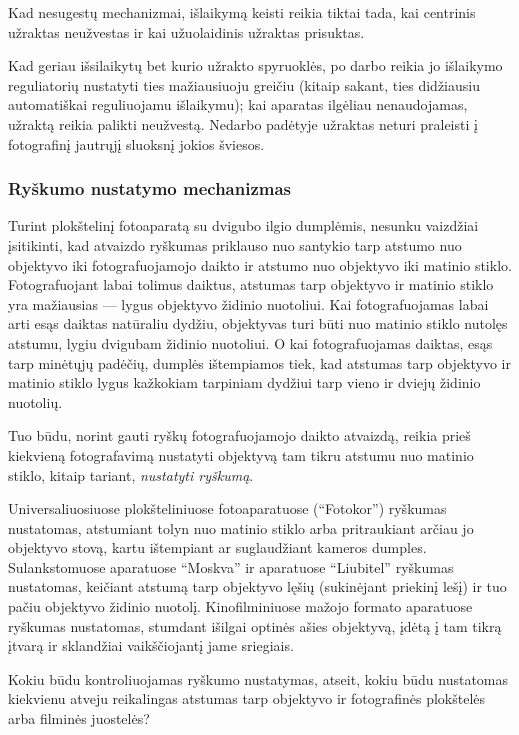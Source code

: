 \documentclass{book}
\begin{document}
					Kad nesugestų mechanizmai, išlaikymą keisti reikia tiktai tada, kai centrinis užraktas neužvestas ir kai užuolaidinis užraktas prisuktas.

					Kad geriau išsilaikytų bet kurio užrakto spyruoklės, po darbo reikia jo išlaikymo reguliatorių nustatyti ties mažiausiuoju greičiu (kitaip sakant, ties didžiausiu automatiškai reguliuojamu išlaikymu); kai aparatas ilgėliau nenaudojamas, užraktą reikia palikti neužvestą. Nedarbo padėtyje užraktas neturi praleisti į fotografinį jautrųjį sluoksnį jokios šviesos.
				\subsubsection*{Ryškumo nustatymo mechanizmas}
					Turint plokštelinį fotoaparatą su dvigubo ilgio dumplėmis, nesunku vaizdžiai įsitikinti, kad atvaizdo ryškumas priklauso nuo santykio tarp atstumo nuo objektyvo iki fotografuojamojo daikto ir atstumo nuo objektyvo iki matinio stiklo. Fotografuojant labai tolimus daiktus, atstumas tarp objektyvo ir matinio stiklo yra mažiausias --- lygus objektyvo židinio nuotoliui. Kai fotografuojamas labai arti esąs daiktas natūraliu dydžiu, objektyvas turi būti nuo matinio stiklo nutolęs atstumu, lygiu dvigubam židinio nuotoliui. O kai fotografuojamas daiktas, esąs tarp minėtųjų padėčių, dumplės ištempiamos tiek, kad atstumas tarp objektyvo ir matinio stiklo lygus kažkokiam tarpiniam dydžiui tarp vieno ir dviejų židinio nuotolių.

					Tuo būdu, norint gauti ryškų fotografuojamojo daikto atvaizdą, reikia prieš kiekvieną fotografavimą nustatyti objektyvą tam tikru atstumu nuo matinio stiklo, kitaip tariant, \textit{nustatyti ryškumą}.

					Universaliuosiuose plokšteliniuose fotoaparatuose (``Fotokor'') ryškumas nustatomas, atstumiant tolyn nuo matinio stiklo arba pritraukiant arčiau jo objektyvo stovą, kartu ištempiant ar suglaudžiant kameros dumples. Sulankstomuose aparatuose ``Moskva'' ir aparatuose ``Liubitel'' ryškumas nustatomas, keičiant atstumą tarp objektyvo lęšių (sukinėjant priekinį lešį) ir tuo pačiu objektyvo židinio nuotolį. Kinofilminiuose mažojo formato aparatuose ryškumas nustatomas, stumdant išilgai optinės ašies objektyvą, įdėtą į tam tikrą įtvarą ir sklandžiai vaikščiojantį jame sriegiais.

					Kokiu būdu kontroliuojamas ryškumo nustatymas, atseit, kokiu būdu nustatomas kiekvienu atveju reikalingas atstumas tarp objektyvo ir fotografinės plokštelės arba filminės juostelės?\\
\end{document}
